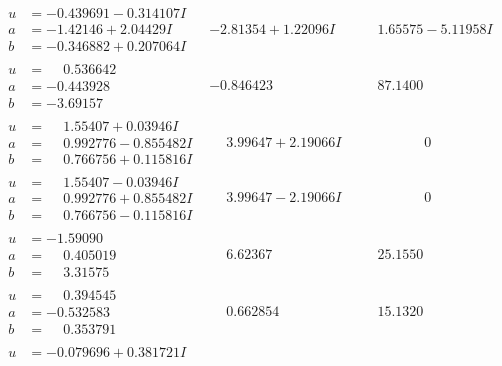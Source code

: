 \documentclass[1p]{elsarticle_modified}
\theoremstyle{definition}
\begin{document}
$$\begin{array}{c|c|c}
\begin{aligned}
u &= -0.439691 - 0.314107 I \\
a &= -1.42146 + 2.04429 I \\
b &= -0.346882 + 0.207064 I\end{aligned}
 & -2.81354 + 1.22096 I & \phantom{-}1.65575 - 5.11958 I \\ \hline\begin{aligned}
u &= \phantom{-}0.536642\phantom{ +0.000000I} \\
a &= -0.443928\phantom{ +0.000000I} \\
b &= -3.69157\phantom{ +0.000000I}\end{aligned}
 & -0.846423\phantom{ +0.000000I} & \phantom{-}87.1400\phantom{ +0.000000I} \\ \hline\begin{aligned}
u &= \phantom{-}1.55407 + 0.03946 I \\
a &= \phantom{-}0.992776 - 0.855482 I \\
b &= \phantom{-}0.766756 + 0.115816 I\end{aligned}
 & \phantom{-}3.99647 + 2.19066 I & \phantom{-0.000000 } 0 \\ \hline\begin{aligned}
u &= \phantom{-}1.55407 - 0.03946 I \\
a &= \phantom{-}0.992776 + 0.855482 I \\
b &= \phantom{-}0.766756 - 0.115816 I\end{aligned}
 & \phantom{-}3.99647 - 2.19066 I & \phantom{-0.000000 } 0 \\ \hline\begin{aligned}
u &= -1.59090\phantom{ +0.000000I} \\
a &= \phantom{-}0.405019\phantom{ +0.000000I} \\
b &= \phantom{-}3.31575\phantom{ +0.000000I}\end{aligned}
 & \phantom{-}6.62367\phantom{ +0.000000I} & \phantom{-}25.1550\phantom{ +0.000000I} \\ \hline\begin{aligned}
u &= \phantom{-}0.394545\phantom{ +0.000000I} \\
a &= -0.532583\phantom{ +0.000000I} \\
b &= \phantom{-}0.353791\phantom{ +0.000000I}\end{aligned}
 & \phantom{-}0.662854\phantom{ +0.000000I} & \phantom{-}15.1320\phantom{ +0.000000I} \\ \hline\begin{aligned}
u &= -0.079696 + 0.381721 I \\

\end{aligned}
\end{array}$$
\end{document}
